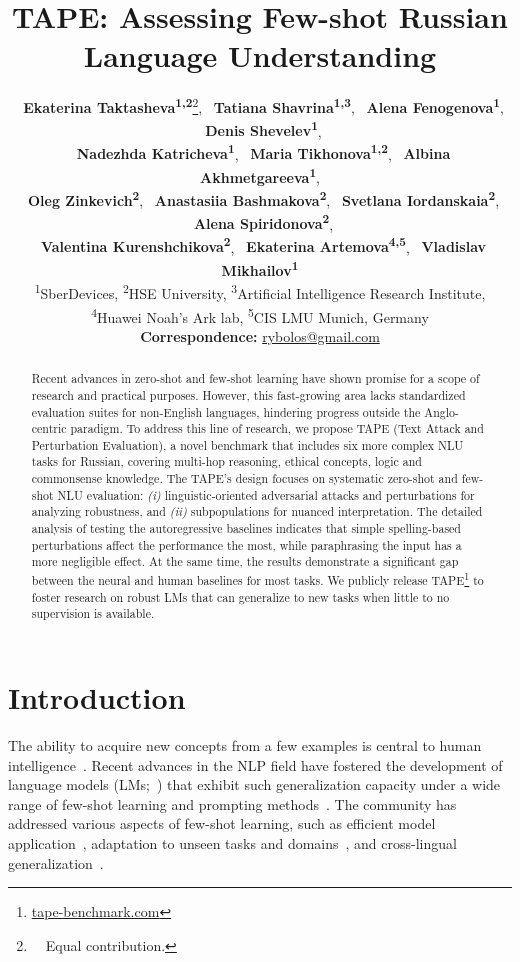 \documentclass[11pt]{article}
\title{TAPE: Assessing Few-shot Russian Language Understanding}
\author{
    ~\textbf{Ekaterina Taktasheva\textsuperscript{1,2}}\thanks{\ \ Equal contribution.},
    ~\textbf{Tatiana Shavrina\textsuperscript{1,3}},
    ~\textbf{Alena Fenogenova\textsuperscript{1}}, 
    ~\textbf{Denis Shevelev\textsuperscript{1}}, \\
    ~\textbf{Nadezhda Katricheva\textsuperscript{1}},
    ~\textbf{Maria Tikhonova\textsuperscript{1,2}}, 
    ~\textbf{Albina Akhmetgareeva\textsuperscript{1}}, \\
    ~\textbf{Oleg Zinkevich\textsuperscript{2}},
    ~\textbf{Anastasiia Bashmakova\textsuperscript{2}}, 
    ~\textbf{Svetlana Iordanskaia\textsuperscript{2}}, 
     ~\textbf{Alena Spiridonova\textsuperscript{2}}, \\
    ~\textbf{Valentina Kurenshchikova\textsuperscript{2}}, 
    ~\textbf{Ekaterina Artemova\textsuperscript{4,5}},
    ~\textbf{Vladislav Mikhailov\textsuperscript{1}} \\ 
    \textsuperscript{1}SberDevices, 
    \textsuperscript{2}HSE University,
    \textsuperscript{3}Artificial Intelligence Research Institute, \\
    \textsuperscript{4}Huawei Noah’s Ark lab,
    \textsuperscript{5}CIS LMU Munich, Germany \\
    \small{
    \textbf{Correspondence:} \href{mailto:rybolos@gmail.com}{rybolos@gmail.com}}
}
\begin{document}
\maketitle

\begin{abstract}
Recent advances in zero-shot and few-shot learning have shown promise for a scope of research and practical purposes. However, this fast-growing area lacks standardized evaluation suites for non-English languages, hindering progress outside the Anglo-centric paradigm. To address this line of research, we propose TAPE (Text Attack and Perturbation Evaluation), a novel benchmark that includes six more complex NLU tasks for Russian, covering multi-hop reasoning, ethical concepts, logic and commonsense knowledge. The TAPE's design focuses on systematic zero-shot and few-shot NLU evaluation: \emph{(i)} linguistic-oriented adversarial attacks and perturbations for analyzing robustness, and \emph{(ii)} subpopulations for nuanced interpretation. The detailed analysis of testing the autoregressive baselines indicates that simple spelling-based perturbations affect the performance the most, while paraphrasing the input has a more negligible effect. At the same time, the results demonstrate a significant gap between the neural and human baselines for most tasks. We publicly release TAPE\footnote{\href{https://tape-benchmark.com/}{tape-benchmark.com}} to foster research on robust LMs that can generalize to new tasks when little to no supervision is available. \end{abstract}



\section{Introduction}
The ability to acquire new concepts from a few examples is central to human intelligence~\cite{tenenbaum2011grow}. Recent advances in the NLP field have fostered the development of language models (LMs;~\citealp{radford2019language,NEURIPS2020_1457c0d6}) that exhibit such generalization capacity under a wide range of few-shot learning and prompting methods~\cite{liu2021pre,beltagy-etal-2022-zero}. The community has addressed various aspects of few-shot learning, such as efficient model application~\cite{schick-schutze-2021-just}, adaptation to
unseen tasks and domains~\cite{bansal-etal-2020-learning,bansal-etal-2020-self}, and cross-lingual generalization~\cite{winata-etal-2021-language,DBLP:journals/corr/abs-2112-10668}.
\end{document}

